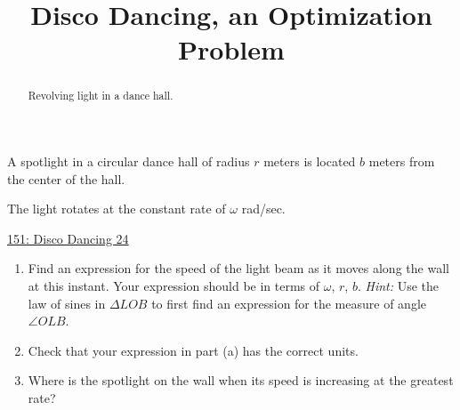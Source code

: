 \documentclass{ximera}
\title{Disco Dancing, an Optimization Problem}
\begin{document}
\begin{abstract}
Revolving light in a dance hall.
\end{abstract}
\maketitle

\begin{question}  \label{QdsadfKGDCCCC}
A spotlight in a circular dance hall of radius $r$ meters is located $b$ meters from the center of the hall. 

The light rotates at the constant rate of $\omega$ rad/sec. 

\begin{onlineOnly}
   \begin{center}
\end{center}
\end{onlineOnly}

\href{https://www.desmos.com/calculator/dve2veveuw}{151: Disco Dancing 24}


\begin{enumerate}
\item Find an expression for the speed of the light beam as it moves along the wall at this instant. Your expression should be in terms of $\omega$, $r$, $b$. \emph{Hint:} Use the law of sines in $\Delta LOB$ to first find an expression for the measure of angle $\angle OLB$.

\item Check that your expression in  part (a) has the correct units.

\item Where is the spotlight on the wall when its speed is increasing at the greatest rate?

\end{enumerate}

\end{question}
\end{document}
